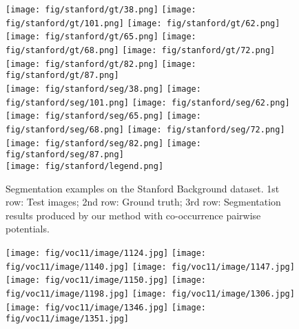\documentclass[10pt,3p]{elsarticle}
\begin{document}
\begin{figure}[!t]
	\texttt{[image: fig/stanford/gt/38.png]}
     \texttt{[image: fig/stanford/gt/101.png]}     
	\texttt{[image: fig/stanford/gt/62.png]}
	\texttt{[image: fig/stanford/gt/65.png]}
     \texttt{[image: fig/stanford/gt/68.png]}
     \texttt{[image: fig/stanford/gt/72.png]}   
     \texttt{[image: fig/stanford/gt/82.png]} 
     \texttt{[image: fig/stanford/gt/87.png]}\\
 
       
     \texttt{[image: fig/stanford/seg/38.png]}
     \texttt{[image: fig/stanford/seg/101.png]}     
	\texttt{[image: fig/stanford/seg/62.png]}
    \texttt{[image: fig/stanford/seg/65.png]}
     \texttt{[image: fig/stanford/seg/68.png]}
     \texttt{[image: fig/stanford/seg/72.png]}   
     \texttt{[image: fig/stanford/seg/82.png]} 
     \texttt{[image: fig/stanford/seg/87.png]}\\

     \texttt{[image: fig/stanford/legend.png]}

\caption{Segmentation examples on the Stanford Background dataset. 1st row: Test images; 2nd row: Ground truth; 
3rd row: Segmentation results produced by our method with co-occurrence pairwise potentials. }
    \label{fig:seg_stanford}      
\end{figure}\begin{figure}[!t]
\centering
%
	\texttt{[image: fig/voc11/image/1124.jpg]}
     \texttt{[image: fig/voc11/image/1140.jpg]}     
	\texttt{[image: fig/voc11/image/1147.jpg]}
    \texttt{[image: fig/voc11/image/1150.jpg]}
     \texttt{[image: fig/voc11/image/1198.jpg]}
     \texttt{[image: fig/voc11/image/1306.jpg]}   
     \texttt{[image: fig/voc11/image/1346.jpg]} 
     \texttt{[image: fig/voc11/image/1351.jpg]}\\
     

\end{figure}
\end{document}
